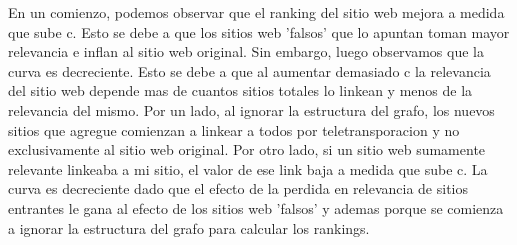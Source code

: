 En un comienzo, podemos observar que el ranking del sitio web mejora a medida que sube c. Esto se debe a que los sitios web 'falsos' que lo apuntan toman mayor relevancia e inflan al sitio web original. Sin embargo, luego observamos que la curva es decreciente. Esto se debe a que al aumentar demasiado c la relevancia del sitio web depende mas de cuantos sitios totales lo linkean y menos de la relevancia del mismo. Por un lado, al ignorar la estructura del grafo, los nuevos sitios que agregue comienzan a linkear a todos por teletransporacion y no exclusivamente al sitio web original. Por otro lado, si un sitio web sumamente relevante linkeaba a mi sitio, el valor de ese link baja a medida que sube c. La curva es decreciente dado que el efecto de la perdida en relevancia de sitios entrantes le gana al efecto de los sitios web 'falsos' y ademas porque se comienza a ignorar la estructura del grafo para calcular los rankings.

\pagebreak
